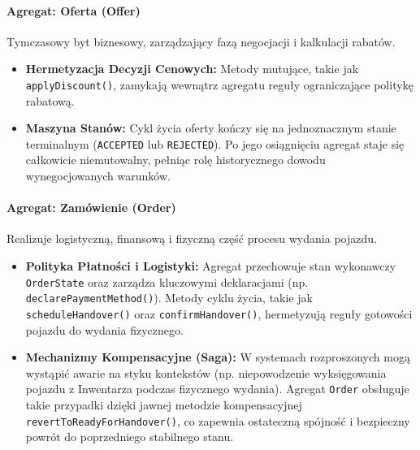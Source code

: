 \paragraph{Agregat: Oferta (Offer)}
Tymczasowy byt biznesowy, zarządzający fazą negocjacji i kalkulacji rabatów.
\begin{itemize}
    \item \textbf{Hermetyzacja Decyzji Cenowych:} Metody mutujące, takie jak \texttt{applyDiscount()}, zamykają wewnątrz agregatu reguły ograniczające politykę rabatową. 
    \item \textbf{Maszyna Stanów:} Cykl życia oferty kończy się na jednoznacznym stanie terminalnym (\texttt{ACCEPTED} lub \texttt{REJECTED}). Po jego osiągnięciu agregat staje się całkowicie niemutowalny, pełniąc rolę historycznego dowodu wynegocjowanych warunków.
\end{itemize}

\paragraph{Agregat: Zamówienie (Order)}
Realizuje logistyczną, finansową i fizyczną część procesu wydania pojazdu.
\begin{itemize}
    \item \textbf{Polityka Płatności i Logistyki:} Agregat przechowuje stan wykonawczy \texttt{OrderState} oraz zarządza kluczowymi deklaracjami (np. \texttt{declarePaymentMethod()}). Metody cyklu życia, takie jak \texttt{scheduleHandover()} oraz \texttt{confirmHandover()}, hermetyzują reguły gotowości pojazdu do wydania fizycznego.
    \item \textbf{Mechanizmy Kompensacyjne (Saga):} W systemach rozproszonych mogą wystąpić awarie na styku kontekstów (np. niepowodzenie wyksięgowania pojazdu z Inwentarza podczas fizycznego wydania). Agregat \texttt{Order} obsługuje takie przypadki dzięki jawnej metodzie kompensacyjnej \linebreak \texttt{revertToReadyForHandover()}, co zapewnia ostateczną spójność i bezpieczny powrót do poprzedniego stabilnego stanu.
\end{itemize}